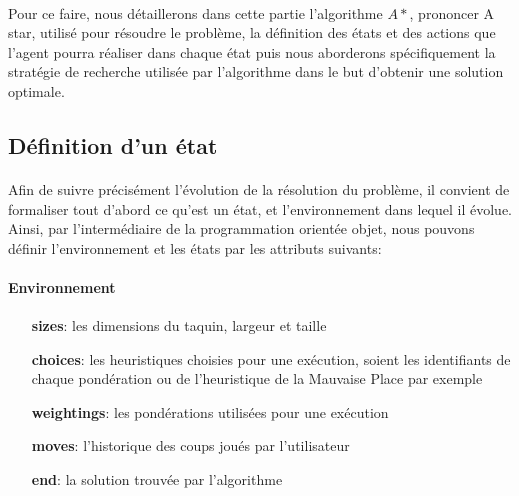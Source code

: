 \documentclass[10pt,a4paper]{report}
\begin{document}
\paragraph{}{Pour ce faire, nous détaillerons dans cette partie l’algorithme ${A*}$, prononcer A star, utilisé pour résoudre le problème, la définition des états et des actions que l’agent pourra réaliser dans chaque état puis nous aborderons spécifiquement la stratégie de recherche utilisée par l’algorithme dans le but d'obtenir une solution optimale.}
\subsection{Définition d’un état}
\paragraph{}{Afin de suivre précisément l’évolution de la résolution du problème, il convient de formaliser tout d’abord ce qu'est un état, et l'environnement dans lequel il évolue. Ainsi, par l'intermédiaire de la programmation orientée objet, nous pouvons définir l'environnement et les états par les attributs suivants:}
\paragraph{Environnement}
\begin{enumerate}
\item [{\ttfamily\bfseries sizes}:] {les dimensions du taquin, largeur et taille}
\item [{\ttfamily\bfseries choices}:] {les heuristiques choisies pour une exécution, soient les identifiants de chaque pondération ou de l'heuristique de la Mauvaise Place par exemple}
\item [{\ttfamily\bfseries weightings}:] {les pondérations utilisées pour une exécution}
\item [{\ttfamily\bfseries moves}:] {l'historique des coups joués par l'utilisateur}
\item [{\ttfamily\bfseries end}:] {la solution trouvée par l'algorithme}
\end{enumerate}
\end{document}

